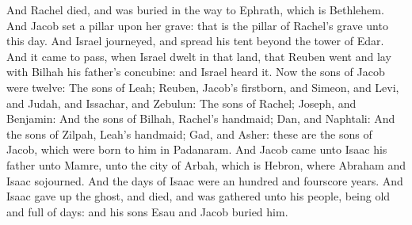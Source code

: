 \begin{biblechapter}
\verse And Rachel died, and was buried in the way to Ephrath, which is Bethlehem.
\verse And Jacob set a pillar upon her grave: that is the pillar of Rachel's grave unto this day.
\verse And Israel journeyed, and spread his tent beyond the tower of Edar.
\verse And it came to pass, when Israel dwelt in that land, that Reuben went and lay with Bilhah his father's concubine: and Israel heard it. Now the sons of Jacob were twelve:
\verse The sons of Leah; Reuben, Jacob's firstborn, and Simeon, and Levi, and Judah, and Issachar, and Zebulun:
\verse The sons of Rachel; Joseph, and Benjamin:
\verse And the sons of Bilhah, Rachel's handmaid; Dan, and Naphtali:
\verse And the sons of Zilpah, Leah's handmaid; Gad, and Asher: these are the sons of Jacob, which were born to him in Padanaram.
\verse And Jacob came unto Isaac his father unto Mamre, unto the city of Arbah, which is Hebron, where Abraham and Isaac sojourned.
\verse And the days of Isaac were an hundred and fourscore years.
\verse And Isaac gave up the ghost, and died, and was gathered unto his people, being old and full of days: and his sons Esau and Jacob buried him.
\end{biblechapter}

